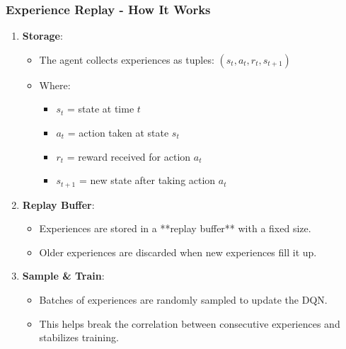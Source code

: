 \documentclass{beamer}
\begin{document}
\begin{frame}[fragile]
    \frametitle{Experience Replay - How It Works}
    \begin{enumerate}
        \item \textbf{Storage}:
        \begin{itemize}
            \item The agent collects experiences as tuples: \((s_t, a_t, r_t, s_{t+1})\)
            \item Where:
            \begin{itemize}
                \item \(s_t\) = state at time \(t\)
                \item \(a_t\) = action taken at state \(s_t\)
                \item \(r_t\) = reward received for action \(a_t\)
                \item \(s_{t+1}\) = new state after taking action \(a_t\)
            \end{itemize}
        \end{itemize}
        
        \item \textbf{Replay Buffer}:
        \begin{itemize}
            \item Experiences are stored in a **replay buffer** with a fixed size.
            \item Older experiences are discarded when new experiences fill it up.
        \end{itemize}
        
        \item \textbf{Sample \& Train}:
        \begin{itemize}
            \item Batches of experiences are randomly sampled to update the DQN.
            \item This helps break the correlation between consecutive experiences and stabilizes training.
        \end{itemize}
        
    \end{enumerate}
\end{frame}
\end{document}
